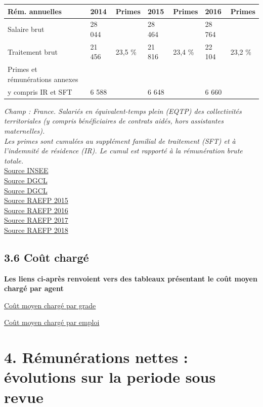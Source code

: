 \begin{longtable}[]{@{}lllllll@{}}
\toprule
Rém. annuelles & 2014 & Primes & 2015 & Primes & 2016 &
Primes\tabularnewline
\midrule
\endhead
Salaire brut & 28 044 & & 28 464 & & 28 764 &\tabularnewline
Traitement brut & 21 456 & 23,5 \% & 21 816 & 23,4 \% & 22 104 & 23,2
\%\tabularnewline
Primes et rémunérations annexes & & & & & &\tabularnewline
y compris IR et SFT & 6 588 & & 6 648 & & 6 660 &\tabularnewline
\bottomrule
\end{longtable}

\emph{Champ : France. Salariés en équivalent-temps plein (EQTP) des
collectivités territoriales (y compris bénéficiaires de contrats aidés,
hors assistantes maternelles).}\\
\emph{Les primes sont cumulées au supplément familial de traitement
(SFT) et à l'indemnité de résidence (IR). Le cumul est rapporté à la
rémunération brute totale.}\\
\href{../Docs/ip1486.xls}{Source INSEE}\\
\href{../Docs/Vue3_Remuneration_2017.xlsx}{Source DGCL}\\
\href{../Docs/Vue-Remunerations-2018.xlsx}{Source DGCL}\\
\href{../Docs/RA_2015.pdf}{Source RAEFP 2015}\\
\href{../Docs/RA_2016.pdf}{Source RAEFP 2016}\\
\href{../Docs/RA_2017.pdf}{Source RAEFP 2017}\\
\href{../Docs/RA_2018.pdf}{Source RAEFP 2018}

\hypertarget{cout-charge}{%
\subsection{3.6 Coût chargé}\label{cout-charge}}

\textbf{Les liens ci-après renvoient vers des tableaux présentant le
coût moyen chargé par agent}

\href{../Bases/Remunerations/cout.eqtp.csv}{Coût moyen chargé par grade}

\href{../Bases/Remunerations/cout.eqtp.emploi.csv}{Coût moyen chargé par
emploi}

\hypertarget{remunerations-nettes-evolutions-sur-la-periode-sous-revue}{%
\section{4. Rémunérations nettes : évolutions sur la periode sous
revue}\label{remunerations-nettes-evolutions-sur-la-periode-sous-revue}}

